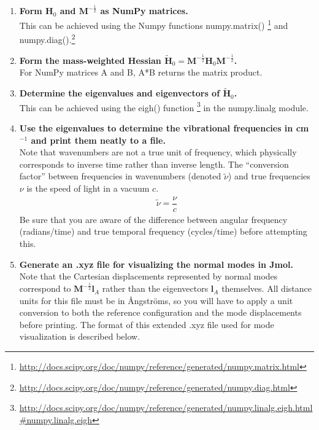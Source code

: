 \documentclass[11pt]{article}
\newcommand{\ttf}[1]{{\ttfamily #1}}
\newcommand{\bo}[1]{\ensuremath{\mathbf{#1}}}
\newcommand{\fr}[2]{\dfrac{#1}{#2}}
\newcommand{\tl}[1]{\ensuremath{\tilde{#1}}}
\begin{document}
\begin{enumerate}[label=\textbf{\arabic*}]
\begin{addmargin}{2cm}{}
\end{addmargin}
The square root of a number can be determined either by using the exponential operator in Python \ttf{a**b}~$=a^b$ or by using the square root function \footnote{\url{http://docs.scipy.org/doc/numpy/reference/generated/numpy.sqrt.html}} provided by the NumPy package.
\item {\bf Form $\bo{H}_0$ and $\bo{M}^{-\frac{1}{2}}$ as NumPy matrices.}\\
This can be achieved using the Numpy functions \ttf{numpy.matrix()} \footnote{\url{http://docs.scipy.org/doc/numpy/reference/generated/numpy.matrix.html}} and \ttf{numpy.diag()}.\footnote{\url{http://docs.scipy.org/doc/numpy/reference/generated/numpy.diag.html}}
\item {\bf Form the mass-weighted Hessian $\tl{\bo{H}}_0 = \bo{M}^{-\frac{1}{2}}\bo{H}_0\bo{M}^{-\frac{1}{2}}$.}\\
For NumPy matrices \ttf{A} and \ttf{B}, \ttf{A*B} returns the matrix product.
\item {\bf Determine the eigenvalues and eigenvectors of $\tl{\bo{H}}_0$.}\\
This can be achieved using the \ttf{eigh()} function \footnote{\url{http://docs.scipy.org/doc/numpy/reference/generated/numpy.linalg.eigh.html\#numpy.linalg.eigh}} in the \ttf{numpy.linalg} module.
\item {\bf Use the eigenvalues to determine the vibrational frequencies in cm$^{-1}$ and print them neatly to a file.}\\
Note that wavenumbers are not a true unit of frequency, which physically corresponds to inverse time rather than inverse length.
The ``conversion factor'' between frequencies in wavenumbers (denoted $\tl\nu$) and true frequencies $\nu$ is the speed of light in a vacuum $c$.
\begin{align*}
	\tl\nu = \fr{\nu}{c}
\end{align*}
Be sure that you are aware of the difference between angular frequency (radians/time) and true temporal frequency (cycles/time) before attempting this.
\item {\bf Generate an \ttf{.xyz} file for visualizing the normal modes in Jmol.}\\
\label{last-step}
Note that the Cartesian displacements represented by normal modes correspond to $\bo{M}^{-\frac{1}{2}}\bm{l}_A$ rather than the eigenvectors $\bm{l}_A$ themselves.
All distance units for this file must be in \AA ngstr\"oms, so you will have to apply a unit conversion to both the reference configuration and the mode displacements before printing.
The format of this extended \ttf{.xyz} file used for mode visualization is described below.
\end{enumerate}
\end{document}
